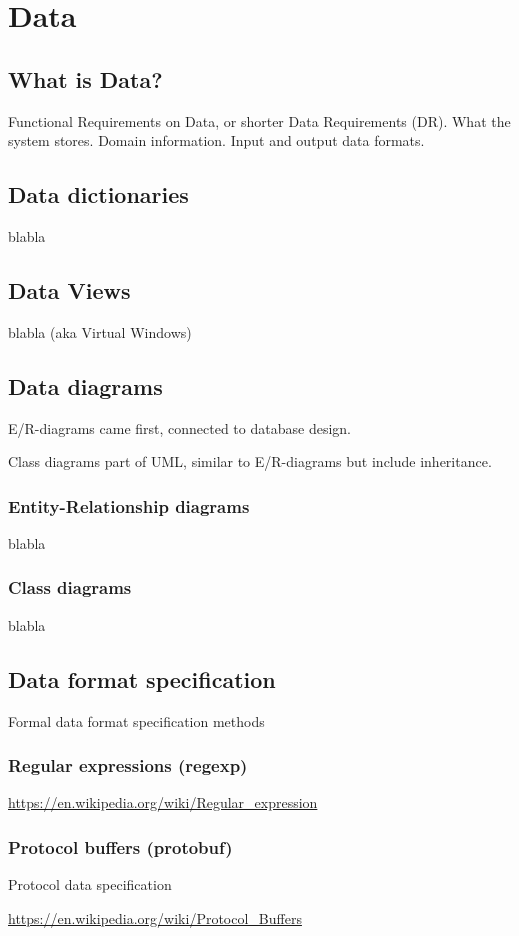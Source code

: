 
\chapter{Data}%

\section{What is Data?}

Functional Requirements on Data, or shorter Data Requirements (DR). What the system stores. Domain information. Input and output data formats.

\section{Data dictionaries}
blabla

\section{Data Views}
blabla  (aka Virtual Windows)


\section{Data diagrams}

E/R-diagrams came first, connected to database design.

Class diagrams part of UML, similar to E/R-diagrams but include inheritance.

\subsection{Entity-Relationship diagrams}
blabla

\subsection{Class diagrams}
blabla



\section{Data format specification}

Formal data format specification methods

\subsection{Regular expressions (regexp)}


\url{https://en.wikipedia.org/wiki/Regular_expression}


\subsection{Protocol buffers (protobuf)}

Protocol data specification

\url{https://en.wikipedia.org/wiki/Protocol_Buffers}
